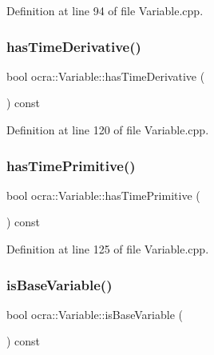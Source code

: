 Definition at line 94 of file Variable.\+cpp.

\hypertarget{classocra_1_1Variable_a034fb7bab13ac0eacf098a44d54799a3}{}\label{classocra_1_1Variable_a034fb7bab13ac0eacf098a44d54799a3} 
\subsubsection{\texorpdfstring{has\+Time\+Derivative()}{hasTimeDerivative()}}
{\footnotesize\ttfamily bool ocra\+::\+Variable\+::has\+Time\+Derivative (\begin{DoxyParamCaption}{ }\end{DoxyParamCaption}) const}



Definition at line 120 of file Variable.\+cpp.

\hypertarget{classocra_1_1Variable_a52e7295611d125901dbf2d3e9984ae13}{}\label{classocra_1_1Variable_a52e7295611d125901dbf2d3e9984ae13} 
\subsubsection{\texorpdfstring{has\+Time\+Primitive()}{hasTimePrimitive()}}
{\footnotesize\ttfamily bool ocra\+::\+Variable\+::has\+Time\+Primitive (\begin{DoxyParamCaption}{ }\end{DoxyParamCaption}) const}



Definition at line 125 of file Variable.\+cpp.

\hypertarget{classocra_1_1Variable_a34c1b66c4dcf6b14181523a516a26951}{}\label{classocra_1_1Variable_a34c1b66c4dcf6b14181523a516a26951} 
\subsubsection{\texorpdfstring{is\+Base\+Variable()}{isBaseVariable()}}
{\footnotesize\ttfamily bool ocra\+::\+Variable\+::is\+Base\+Variable (\begin{DoxyParamCaption}{ }\end{DoxyParamCaption}) const\hspace{0.3cm}{\ttfamily [virtual]}}

